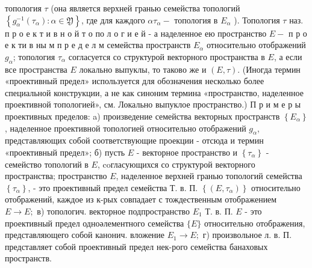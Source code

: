 \documentclass[10pt]{article}
\begin{document}
топология $\tau$ (она является верхней гранью семейства топологий $\left\{g_{\alpha}^{-1}\left(\tau_{\alpha}\right): \alpha \in \mathfrak{Y}\right\}$, где для каждого $\alpha \tau_{\alpha}-$ топология в $E_{\alpha}$ ). Топология $\tau$ наз. п р о е к т и в н о й т о по л о г и е й - а наделенное ею пространство $E-$ п р о е к ти в ны м п р е д е л м семейства пространств $E_{\alpha}$ относительно отображений $g_{\alpha}$; топология $\tau_{\alpha}$ согласуется со структурой векторного пространства в $E$, а если все пространства $E$ локально выпуклы, то таково же и $(E, \tau)$. (Иногда термин «проективный предел» используется для обозначения несколько более специальной конструкции, а не как синоним термина «пространство, наделенное проективной топологией», см. Локально выпуклое пространство.) П р и м е р ы проективных пределов: a) произведение семейства векторных пространств $\left\{E_{\alpha}\right\}$, наделенное проективной топологией относительно отображений $g_{\alpha}$, представляющих собой соответствующие проекции - отсюда и термин «проективный предел»; б) пусть $E$ - векторное пространство и $\left\{\tau_{\alpha}\right\}$ - семейство топологий в $E$, coгласующихся со структурой векторного пространства; пространство $E$, наделенное верхней гранью топологий семейства $\left\{\tau_{\alpha}\right\}$, - это проективный предел семейства Т. в. П. $\left\{\left(E, \tau_{\alpha}\right)\right\}$ относительно отображений, каждое из к-рых совпадает с тождественным отображением $E \rightarrow E ;$ в) топологич. векторное подпространство $E_{1}$ Т. в. П. $E$ - это проективный предел одноәлементного семейства $\{E\}$ относительно отображения, представляющего собой канонич. вложение $E_{1} \rightarrow E ;$ г) произвольное л. в. П. представляет собой проективный предел нек-рого семейства банаховых пространств.
\end{document}
